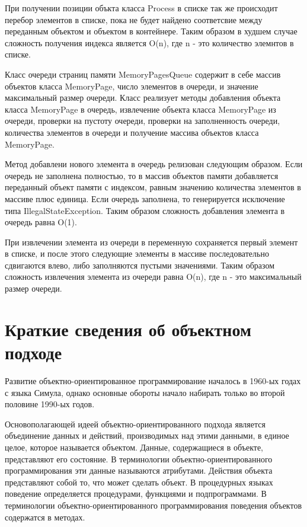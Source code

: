 \documentclass[russian,utf8,simple,hpadding=10mm,vpadding=20mm]{eskdtext}
\begin{document}
При получении позиции объкта класса Process в списке  так же происходит перебор элементов в списке, пока не будет найдено соответсвие между переданным объектом и объектом в контейнере. Таким образом в худшем случае сложность получения индекса является O(n), где n - это количество элемнтов в списке.

Класс очереди страниц памяти MemoryPagesQueue содержит в себе массив объектов класса MemoryPage, число элементов в очереди, и значение максимальный размер очереди. Класс реализует методы добавления объекта класса MemoryPage в очередь, извлечение объекта класса MemoryPage из очереди, проверки на пустоту очереди, проверки на заполненность очереди, количества элементов в очереди и получение массива объектов класса MemoryPage.

Метод добавлени нового элемента в очередь релизован следующим образом. Если очередь не заполнена полностью, то в массив объектов памяти добавляется переданный объект памяти с индексом, равным значению количества элементов в массиве плюс единица. Если очередь заполнена, то генерируется исключение типа IllegalStateException. Таким образом сложность добавления элемента в очередь равна O(1).

При извлечении элемента из очереди в переменную сохраняется первый элемент в списке, и после этого следующие элементы в массиве последовательно сдвигаются влево, либо заполняются пустыми значениями. Таким образом сложность извлечения элемента из очереди равна O(n), где n - это максимальный размер очереди.

\newpage
\parindent=15mm
\doublespacing
\section{Краткие сведения об объектном подходе}
Развитие объектно-ориентированное программирование началось в 1960-ых годах с языка Симула, однако основные обороты начало набирать только во второй половине 1990-ых годов. 

Основополагающей идеей объектно-ориентированного подхода является объединение данных и действий, производимых над этими данными, в единое целое, которое называется объектом. Данные, содержащиеся в объекте, представляют его состояние. В терминологии объектно-ориентированного программирования эти данные называются атрибутами. Действия объекта представляют собой то, что может сделать объект. В процедурных языках поведение определяется процедурами, функциями и подпрограммами. В терминологии объектно-ориентированного программирования поведения объектов содержатся в методах.
\end{document}
